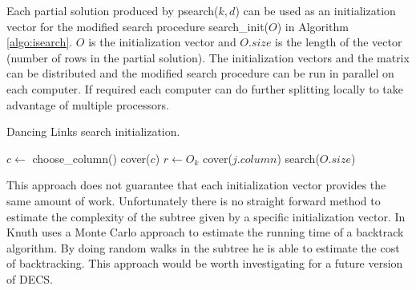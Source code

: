 Each partial solution produced by psearch($k, d$) can be used as an initialization vector for the modified search procedure search\_init($O$) in Algorithm \ref{algo:isearch}.
$O$ is the initialization vector and $O.size$ is the length of the vector (number of rows in the partial solution).
The initialization vectors and the matrix can be distributed and the modified search procedure can be run in parallel on each computer.
If required each computer can do further splitting locally to take advantage of multiple processors.
\begin{algorithm}[htbp]
	\caption{Dancing Links search initialization.}
	\label{algo:isearch}
	\begin{distribalgo}[1]
				\STATE $c \leftarrow$ choose\_column()
				\STATE cover($c$)
				\STATE $r \leftarrow O_k$
					\STATE cover($j.column$)
				\ENDFOR
			\ENDFOR
			\STATE search($O.size$)  
		\ENDPROC
	\end{distribalgo}
\end{algorithm}

This approach does not guarantee that each initialization vector provides the same amount of work.
Unfortunately there is no straight forward method to estimate the complexity of the subtree given by a specific initialization vector.
In \cite{knuth75backtracking} Knuth uses a Monte Carlo approach to estimate the running time of a backtrack algorithm.
By doing random walks in the subtree he is able to estimate the cost of backtracking.
This approach would be worth investigating for a future version of DECS.